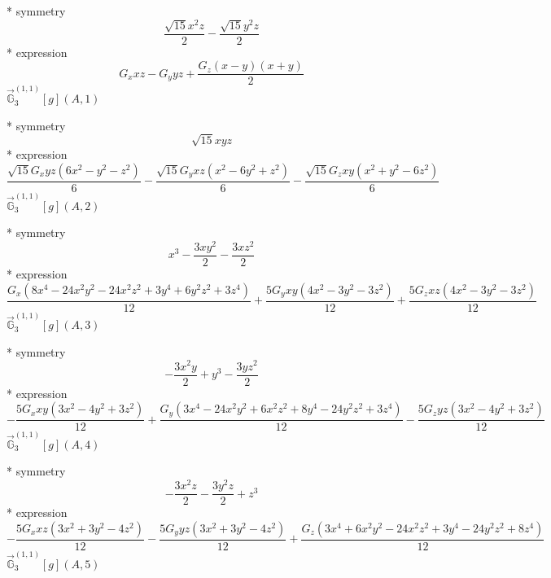 \documentclass[fleqn,8pt]{jsarticle}
\begin{document}
\noindent\quad ** symmetry
\begin{dmath*}
\frac{\sqrt{15} x^{2} z}{2} - \frac{\sqrt{15} y^{2} z}{2}
\end{dmath*}
\noindent\quad ** expression
\begin{dmath*}
G_{x} x z - G_{y} y z + \frac{G_{z} \left(x - y\right) \left(x + y\right)}{2}
\end{dmath*}
\noindent\quad $\vec{\mathbb{G}}_{3}^{(1,1)}[g](A,1)$

\noindent\quad ** symmetry
\begin{dmath*}
\sqrt{15} x y z
\end{dmath*}
\noindent\quad ** expression
\begin{dmath*}
\frac{\sqrt{15} G_{x} y z \left(6 x^{2} - y^{2} - z^{2}\right)}{6} - \frac{\sqrt{15} G_{y} x z \left(x^{2} - 6 y^{2} + z^{2}\right)}{6} - \frac{\sqrt{15} G_{z} x y \left(x^{2} + y^{2} - 6 z^{2}\right)}{6}
\end{dmath*}
\noindent\quad $\vec{\mathbb{G}}_{3}^{(1,1)}[g](A,2)$

\noindent\quad ** symmetry
\begin{dmath*}
x^{3} - \frac{3 x y^{2}}{2} - \frac{3 x z^{2}}{2}
\end{dmath*}
\noindent\quad ** expression
\begin{dmath*}
\frac{G_{x} \left(8 x^{4} - 24 x^{2} y^{2} - 24 x^{2} z^{2} + 3 y^{4} + 6 y^{2} z^{2} + 3 z^{4}\right)}{12} + \frac{5 G_{y} x y \left(4 x^{2} - 3 y^{2} - 3 z^{2}\right)}{12} + \frac{5 G_{z} x z \left(4 x^{2} - 3 y^{2} - 3 z^{2}\right)}{12}
\end{dmath*}
\noindent\quad $\vec{\mathbb{G}}_{3}^{(1,1)}[g](A,3)$

\noindent\quad ** symmetry
\begin{dmath*}
- \frac{3 x^{2} y}{2} + y^{3} - \frac{3 y z^{2}}{2}
\end{dmath*}
\noindent\quad ** expression
\begin{dmath*}
- \frac{5 G_{x} x y \left(3 x^{2} - 4 y^{2} + 3 z^{2}\right)}{12} + \frac{G_{y} \left(3 x^{4} - 24 x^{2} y^{2} + 6 x^{2} z^{2} + 8 y^{4} - 24 y^{2} z^{2} + 3 z^{4}\right)}{12} - \frac{5 G_{z} y z \left(3 x^{2} - 4 y^{2} + 3 z^{2}\right)}{12}
\end{dmath*}
\noindent\quad $\vec{\mathbb{G}}_{3}^{(1,1)}[g](A,4)$

\noindent\quad ** symmetry
\begin{dmath*}
- \frac{3 x^{2} z}{2} - \frac{3 y^{2} z}{2} + z^{3}
\end{dmath*}
\noindent\quad ** expression
\begin{dmath*}
- \frac{5 G_{x} x z \left(3 x^{2} + 3 y^{2} - 4 z^{2}\right)}{12} - \frac{5 G_{y} y z \left(3 x^{2} + 3 y^{2} - 4 z^{2}\right)}{12} + \frac{G_{z} \left(3 x^{4} + 6 x^{2} y^{2} - 24 x^{2} z^{2} + 3 y^{4} - 24 y^{2} z^{2} + 8 z^{4}\right)}{12}
\end{dmath*}
\noindent\quad $\vec{\mathbb{G}}_{3}^{(1,1)}[g](A,5)$
\end{document}
